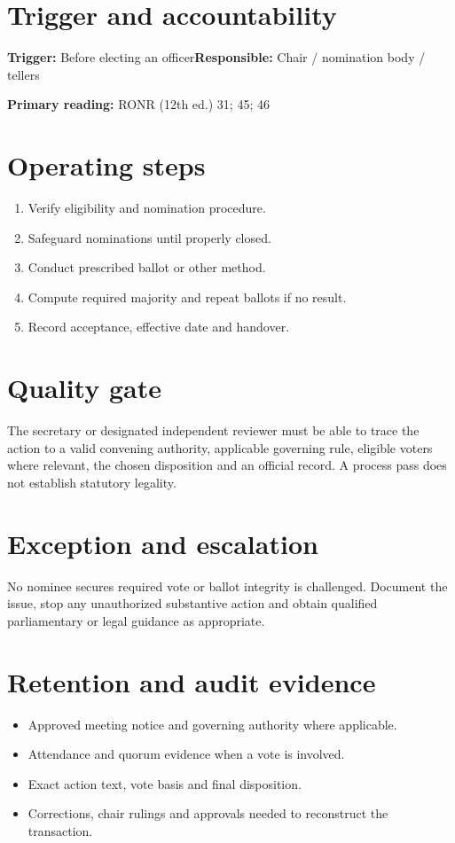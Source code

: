\documentclass[11pt]{article}
\begin{document}
\SuiteOpen
{}
\section{Trigger and accountability}
\textbf{Trigger:} Before electing an officer\quad\textbf{Responsible:} Chair / nomination body / tellers

\textbf{Primary reading:} RONR (12th ed.) 31; 45; 46

\section{Operating steps}
\begin{enumerate}[leftmargin=*,itemsep=4pt]
\item Verify eligibility and nomination procedure.
\item Safeguard nominations until properly closed.
\item Conduct prescribed ballot or other method.
\item Compute required majority and repeat ballots if no result.
\item Record acceptance, effective date and handover.
\end{enumerate}

\section{Quality gate}
The secretary or designated independent reviewer must be able to trace the action to a valid convening authority, applicable governing rule, eligible voters where relevant, the chosen disposition and an official record. A process pass does not establish statutory legality.

\section{Exception and escalation}
No nominee secures required vote or ballot integrity is challenged. Document the issue, stop any unauthorized substantive action and obtain qualified parliamentary or legal guidance as appropriate.

\section{Retention and audit evidence}
\begin{itemize}[leftmargin=*,itemsep=4pt]
\item Approved meeting notice and governing authority where applicable.
\item Attendance and quorum evidence when a vote is involved.
\item Exact action text, vote basis and final disposition.
\item Corrections, chair rulings and approvals needed to reconstruct the transaction.
\end{itemize}
\end{document}
